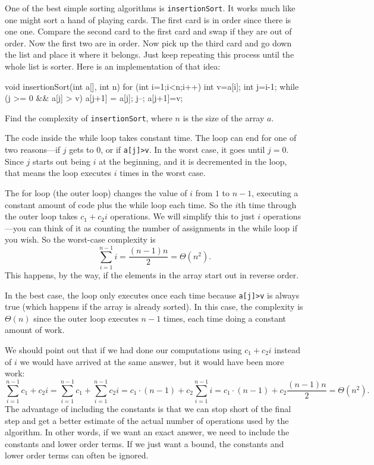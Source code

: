 \begin{exa}
One of the best simple sorting algorithms is \verb+insertionSort+. 
It works much like one might sort a hand of playing cards.
The first card is in order since there is one one. Compare the second card to the first card and
swap if they are out of order. Now the first two are in order. Now pick up the third card and
go down the list and place it where it belongs. Just keep repeating this process until the whole
list is sorter. Here is an implementation of that idea:

\begin{code}
    void insertionSort(int a[], int n) {
        for (int i=1;i<n;i++) { 
            int v=a[i];  
            int j=i-1;
            while (j >= 0 && a[j] > v) {
                a[j+1] = a[j];  
                j--; 
            }
            a[j+1]=v;
        }
    }
\end{code}

Find the complexity of \verb+insertionSort+, where $n$ is the size of the array $a$.
\begin{sol}
The code inside the while loop takes constant time.
The loop can end for one of two reasons---if $j$ gets to $0$, or if \verb+a[j]>v+.  
In the worst case, it goes until $j=0$.
Since $j$ starts out being $i$ at the beginning, and it is decremented in the loop,
that means the loop executes $i$ times in the worst case.  

The for loop (the outer loop) 
changes the value of $i$ from $1$ to $n-1$, executing a constant amount
of code plus the while loop each time. So the $i$th time through the outer loop
takes $c_1+c_2i$ operations. 
We will simplify this to just $i$ operations---you 
can think of it as counting the number of assignments in the while loop if you wish.  
So the worst-case complexity is 
$$\sum_{i=1}^{n-1}i = \frac{(n-1)n}{2} =\Theta(n^2).$$
This happens, by the way, if the elements in the array start out in reverse order.

In the best case, the loop only executes once each time because \verb+a[j]>v+ is always true
(which happens if the array is already sorted).  
In this case, the complexity is $\Theta(n)$ since the outer loop executes $n-1$ times,
each time doing a constant amount of work.
\end{sol}

We should point out that if we had done our computations using $c_1+c_2i$ 
instead of $i$ we would have arrived at the same answer, 
but it would have been more work:
$$\sum_{i=1}^{n-1}c_1+c_2i = 
\sum_{i=1}^{n-1}c_1+\sum_{i=1}^{n-1}c_2i = 
c_1\cdot (n-1)+c_2\sum_{i=1}^{n-1}i = 
c_1\cdot (n-1)+c_2\frac{(n-1)n}{2} =\Theta(n^2).$$
The advantage of including the constants is that we can stop short of the final
step and get a better estimate of the actual number of operations used by the algorithm.
In other words, if we want an exact answer, we need to include the constants and lower
order terms.
If we just want a bound, the constants and lower order terms can often be ignored.
\end{exa}

